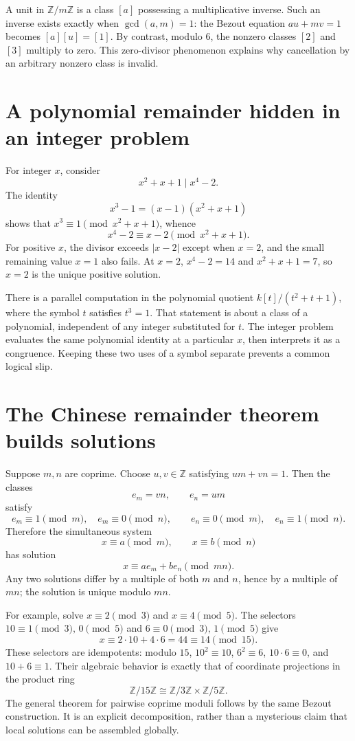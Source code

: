 A unit in \(\mathbb Z/m\mathbb Z\) is a class \([a]\) possessing a multiplicative inverse. Such an inverse exists exactly when \(\gcd(a,m)=1\): the Bezout equation \(au+mv=1\) becomes \([a][u]=[1]\). By contrast, modulo \(6\), the nonzero classes \([2]\) and \([3]\) multiply to zero. This zero-divisor phenomenon explains why cancellation by an arbitrary nonzero class is invalid.

\section{A polynomial remainder hidden in an integer problem}

For integer \(x\), consider
\[
 x^2+x+1\mid x^4-2.
\]
The identity
\[
 x^3-1=(x-1)(x^2+x+1)
\]
shows that \(x^3\equiv1\pmod{x^2+x+1}\), whence
\[
 x^4-2\equiv x-2\pmod{x^2+x+1}.
\]
For positive \(x\), the divisor exceeds \(|x-2|\) except when \(x=2\), and the small remaining value \(x=1\) also fails. At \(x=2\), \(x^4-2=14\) and \(x^2+x+1=7\), so \(x=2\) is the unique positive solution.

There is a parallel computation in the polynomial quotient \(k[t]/(t^2+t+1)\), where the symbol \(t\) satisfies \(t^3=1\). That statement is about a class of a polynomial, independent of any integer substituted for \(t\). The integer problem evaluates the same polynomial identity at a particular \(x\), then interprets it as a congruence. Keeping these two uses of a symbol separate prevents a common logical slip.

\section{The Chinese remainder theorem builds solutions}

Suppose \(m,n\) are coprime. Choose \(u,v\in\mathbb Z\) satisfying \(um+vn=1\). Then the classes
\[
 e_m=vn,\qquad e_n=um
\]
satisfy
\[
 e_m\equiv1\pmod m,\quad e_m\equiv0\pmod n,\qquad
 e_n\equiv0\pmod m,\quad e_n\equiv1\pmod n.
\]
Therefore the simultaneous system
\[
 x\equiv a\pmod m,\qquad x\equiv b\pmod n
\]
has solution
\[
 \boxed{x\equiv ae_m+be_n\pmod{mn}.}
\]
Any two solutions differ by a multiple of both \(m\) and \(n\), hence by a multiple of \(mn\); the solution is unique modulo \(mn\).

For example, solve \(x\equiv2\pmod3\) and \(x\equiv4\pmod5\). The selectors \(10\equiv1\pmod3,\,0\pmod5\) and \(6\equiv0\pmod3,\,1\pmod5\) give
\[
 x\equiv2\cdot10+4\cdot6=44\equiv14\pmod{15}.
\]
These selectors are idempotents: modulo \(15\), \(10^2\equiv10\), \(6^2\equiv6\), \(10\cdot6\equiv0\), and \(10+6\equiv1\). Their algebraic behavior is exactly that of coordinate projections in the product ring
\[
 \mathbb Z/15\mathbb Z\cong\mathbb Z/3\mathbb Z\times\mathbb Z/5\mathbb Z.
\]
The general theorem for pairwise coprime moduli follows by the same Bezout construction. It is an explicit decomposition, rather than a mysterious claim that local solutions can be assembled globally.

